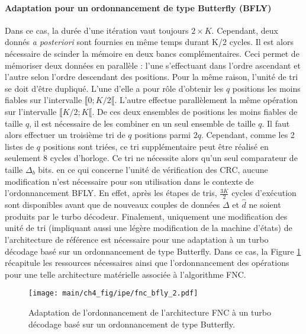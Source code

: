\paragraph*{Adaptation pour un ordonnancement de type Butterfly (BFLY)}
Dans ce cas, la durée d'une itération vaut toujours $2\times K$. Cependant, deux donnés \textit{a posteriori} sont 
fournies en même temps durant K/2 cycles. Il est alors nécessaire de scinder la mémoire en deux bancs complémentaires.
Ceci permet de mémoriser deux données en parallèle : l'une s'effectuant dans l'ordre ascendant 
et l'autre selon l'ordre descendant des positions. Pour la même raison, l'unité de tri se doit d'être dupliqué. L'une
d'elle a pour rôle d'obtenir les $q$ positions les moins fiables sur l'intervalle $\llbracket 0; K/2 \llbracket$. L'autre
effectue parallèlement la même opération sur l'intervalle $\llbracket K/2; K \llbracket$. De ces deux ensembles de positions
les moins fiables de taille $q$, il est nécessaire de les combiner en un seul ensemble de taille $q$. Il faut alors 
effectuer un troisième tri de $q$ positions parmi $2q$. Cependant, comme les 2 listes de $q$ positions sont triées, ce 
tri supplémentaire  peut être réalisé en seulement 8 cycles d'horloge. Ce tri ne nécessite alors qu'un seul comparateur 
de taille $\Delta_b$ bits. en ce qui concerne l'unité de vérification des CRC, aucune modification n'est nécessaire pour
son utilisation dans le contexte de l'ordonnancement BFLY. En effet, après les étapes de tris, $\frac{3K}{2}$ cycles 
d'exécution sont disponibles avant que de nouveaux couples de données $\Delta$ et $\hat{d}$ ne soient produits par le
turbo décodeur. Finalement, uniquement une modification des unité de tri (impliquant aussi une légère modification de 
la machine d'états) de l'architecture de référence est nécessaire pour une adaptation à un turbo décodage basé sur un 
ordonnancement de type Butterfly. Dans ce cas, la Figure \ref{fig:fnc_bfly} récapitule les ressources nécessaires ainsi 
que l'ordonnancement des opérations pour une telle architecture matérielle associée à l'algorithme FNC.

\begin{figure}[!h]
	\centering
	\texttt{[image: main/ch4\_fig/ipe/fnc\_bfly\_2.pdf]}
	\caption{Adaptation de l'ordonnancement de l'architecture FNC à un turbo décodage basé sur un ordonnancement de 
	type Butterfly. \label{fig:fnc_bfly}}
\end{figure}


